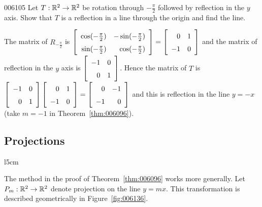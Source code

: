 \begin{example}{}{006105}
Let $T : \mathbb{R}^2 \to \mathbb{R}^2$ be rotation through $-\frac{\pi}{2}$ followed by reflection in the $y$ axis. Show that $T$ is a reflection in a line through the origin and find the line.

\begin{solution}
  The matrix of $R_{-\frac{\pi}{2}}$
 is $\leftB \def\arraystretch{1.5} \begin{array}{rr}
 \cos(-\frac{\pi}{2}) & -\sin(-\frac{\pi}{2}) \\
 \sin(-\frac{\pi}{2}) & \cos(-\frac{\pi}{2})
 \end{array} \rightB = \leftB \begin{array}{rr}
 0 & 1 \\
 -1 & 0
 \end{array} \rightB$
 and the matrix of reflection in the $y$ axis is $\leftB \begin{array}{rr}
 -1 & 0 \\
 0 & 1
 \end{array} \rightB$.
 Hence the matrix of $T$ is $\leftB \begin{array}{rr}
 -1 & 0 \\
 0 & 1
 \end{array} \rightB \leftB \begin{array}{rr}
 0 & 1 \\
 -1 & 0
 \end{array} \rightB = \leftB \begin{array}{rr}
 0 & -1 \\
 -1 & 0
 \end{array} \rightB$
 and this is reflection in the line $y = -x$ (take $m = -1$ in Theorem~\ref{thm:006096}).
\end{solution}
\end{example}

\subsection*{Projections}
\begin{wrapfigure}[12]{l}{5cm} 
\centering

\caption{\label{fig:006136}}
\end{wrapfigure}

The method in the proof of Theorem~\ref{thm:006096} works more generally. Let $P_{m} : \mathbb{R}^2 \to \mathbb{R}^2$ denote projection on the line $y = mx$. This transformation is described geometrically in Figure~\ref{fig:006136}. 


